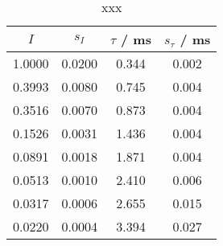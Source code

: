 \begin{table}[H]
\caption{xxx}
\begin{center}
\begin{tabular}{|c|c|c|c|}
  \hline
  $I$ & $s_I$ & $\tau$ / ms & $s_\tau$ / ms \\ \hline
  1.0000 & 0.0200 & 0.344 & 0.002 \\ \hline
  0.3993 & 0.0080 & 0.745 & 0.004 \\ \hline
  0.3516 & 0.0070 & 0.873 & 0.004 \\ \hline
  0.1526 & 0.0031 & 1.436 & 0.004 \\ \hline
  0.0891 & 0.0018 & 1.871 & 0.004 \\ \hline
  0.0513 & 0.0010 & 2.410 & 0.006 \\ \hline
  0.0317 & 0.0006 & 2.655 & 0.015 \\ \hline
  0.0220 & 0.0004 & 3.394 & 0.027 \\ \hline
\end{tabular}
\end{center}
\label{tab:deh:fitres}
\end{table}
